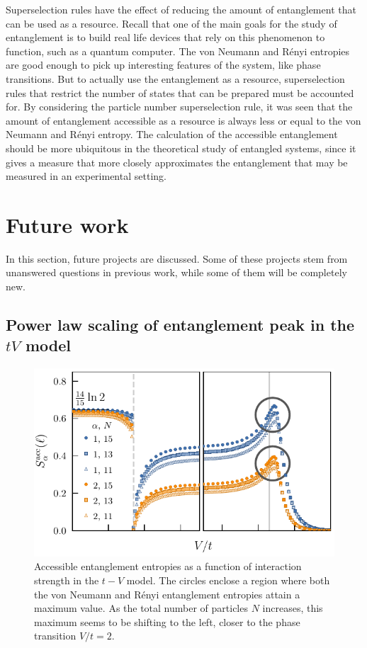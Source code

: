 Superselection rules have the effect of reducing the amount of entanglement that can be used as a resource. Recall that one of the main goals for the study of entanglement is to build real life devices that rely on this phenomenon to function, such as a quantum computer. The von Neumann and R\'enyi entropies are good enough to pick up interesting features of the system, like phase transitions. But to actually use the entanglement as a resource, superselection rules that restrict the number of states that can be prepared must be accounted for. By considering the particle number superselection rule, it was seen that the amount of entanglement accessible as a resource is always less or equal to the von Neumann and R\'enyi entropy. The calculation of the accessible entanglement should be more ubiquitous in the theoretical study of entangled systems, since it gives a measure that more closely approximates the entanglement that may be measured in an experimental setting.


\section{Future work}

	In this section, future projects are discussed. Some of these projects stem from unanswered questions in previous work, while some of them will be completely new.
	
	\subsection{Power law scaling of entanglement peak in the $tV$ model}
	
	\begin{figure}[h]
	\begin{center}
	\includegraphics[scale=1.0]{operationalEntanglementEntropies_SOP5_withPeakCircles.pdf}
	\end{center}
	\caption{Accessible entanglement entropies as a function of interaction strength in the $t-V$ model. The circles enclose a region where both the von Neumann and R\'enyi entanglement entropies attain a maximum value. As the total number of particles $N$ increases, this maximum seems to be shifting to the left, closer to the phase transition $V/t=2$.}
	\label{fig:OEE_circledPeaks}
	\end{figure}
	
